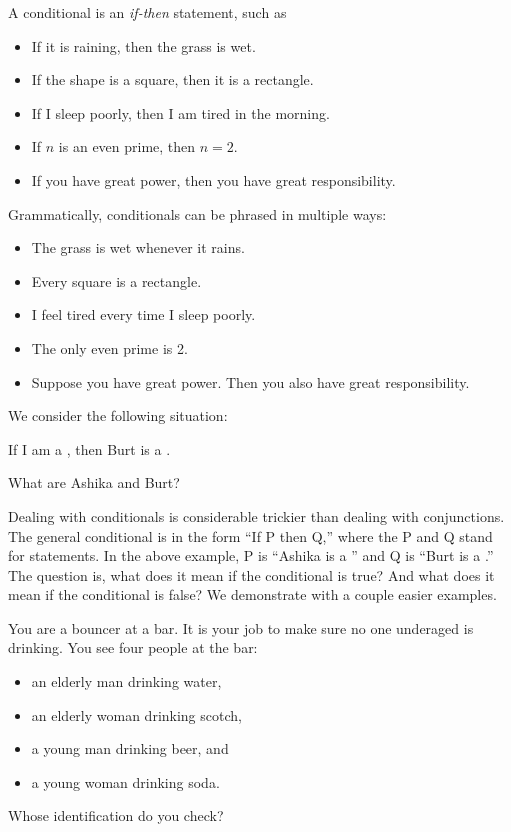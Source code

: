 \documentclass{tufte-book}
\begin{document}
A conditional is an \emph{if-then} statement, such as 
\begin{itemize}
    \item If it is raining, then the grass is wet.
    \item If the shape is a square, then it is a rectangle.
    \item If I sleep poorly, then I am tired in the morning.
    \item If $n$ is an even prime, then $n = 2$.
    \item If you have great power, then you have great responsibility.
\end{itemize}
Grammatically, conditionals can be phrased in multiple ways:
\begin{itemize}
    \item The grass is wet whenever it rains.
    \item Every square is a rectangle.
    \item I feel tired every time I sleep poorly.
    \item The only even prime is 2.
    \item Suppose you have great power. Then you also have great responsibility.
\end{itemize}

We consider the following situation:
\begin{example}
  \begin{dialogue}
     If I am a \knight, then Burt is a \knave.
  \end{dialogue}
\end{example}
What are Ashika and Burt?

Dealing with conditionals is considerable trickier than dealing with conjunctions. The general conditional is in the form ``If P then Q,'' where the P and Q stand for statements. In the above example, P is ``Ashika is a \knight'' and Q is ``Burt is a \knave.'' The question is, what does it mean if the conditional is true? And what does it mean if the conditional is false? We demonstrate with a couple easier examples.

\begin{example}
  You are a bouncer at a bar. It is your job to make sure no one underaged is drinking. You see four people at the bar:
  \begin{itemize}
      \item an elderly man drinking water,
      \item an elderly woman drinking scotch,
      \item a young man drinking beer, and
      \item a young woman drinking soda.
  \end{itemize}
  Whose identification do you check?
\end{example}
\end{document}
